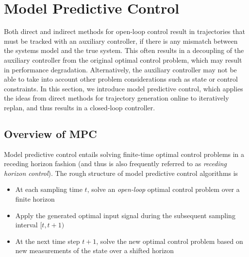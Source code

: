 \section{Model Predictive Control}

Both direct and indirect methods for open-loop control result in trajectories that must be tracked with an auxiliary controller, if there is any mismatch between the systems model and the true system. This often results in a decoupling of the auxiliary controller from the original optimal control problem, which may result in performance degradation. Alternatively, the auxiliary controller may not be able to take into account other problem considerations such as state or control constraints. In this section, we introduce model predictive control, which applies the ideas from direct methods for trajectory generation online to iteratively replan, and thus results in a closed-loop controller.

\subsection{Overview of MPC}

Model predictive control entails solving finite-time optimal control problems in a receding horizon fashion (and thus is also frequently referred to as \textit{receding horizon control}). The rough structure of model predictive control algorithms is
\begin{itemize}
    \item At each sampling time $t$, solve an \textit{open-loop} optimal control problem over a finite horizon
    \item Apply the generated optimal input signal during the subsequent sampling interval $[t,t+1)$
    \item At the next time step $t+1$, solve the new optimal control problem based on new measurements of the state over a shifted horizon
\end{itemize}


